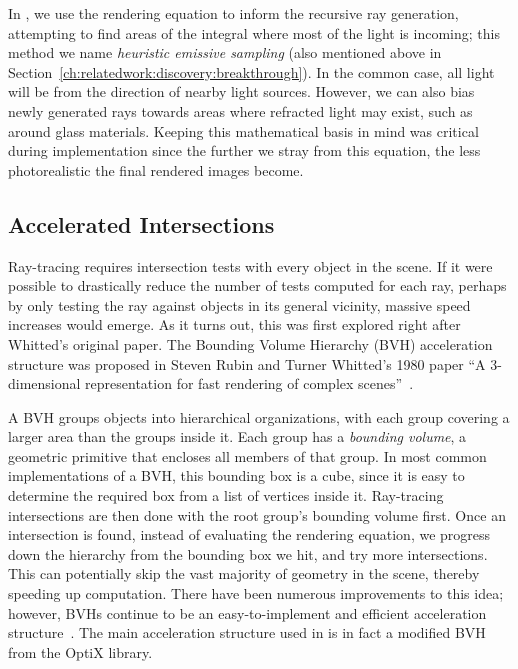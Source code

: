 In \name{}, we use the rendering equation to inform the recursive ray generation, attempting to find areas of the integral where most of the light is incoming; this method we name {\it heuristic emissive sampling\/} (also mentioned above in Section~\ref{ch:relatedwork:discovery:breakthrough}).
In the common case, all light will be from the direction of nearby light sources.
However, we can also bias newly generated rays towards areas where refracted light may exist, such as around glass materials.
Keeping this mathematical basis in mind was critical during implementation since the further we stray from this equation, the less photorealistic the final rendered images become.



\subsection{Accelerated Intersections}

Ray-tracing requires intersection tests with every object in the scene.
If it were possible to drastically reduce the number of tests computed for each ray, perhaps by only testing the ray against objects in its general vicinity, massive speed increases would emerge.
As it turns out, this was first explored right after Whitted's original paper.
The Bounding Volume Hierarchy (BVH) acceleration structure was proposed in Steven Rubin and Turner Whitted's 1980 paper ``A 3-dimensional representation for fast rendering of complex scenes''~\cite{rubin1980}.

A BVH groups objects into hierarchical organizations, with each group covering a larger area than the groups inside it.
Each group has a {\it bounding volume}, a geometric primitive that encloses all members of that group.
In most common implementations of a BVH, this bounding box is a cube, since it is easy to determine the required box from a list of vertices inside it.
Ray-tracing intersections are then done with the root group's bounding volume first.
Once an intersection is found, instead of evaluating the rendering equation, we progress down the hierarchy from the bounding box we hit, and try more intersections.
This can potentially skip the vast majority of geometry in the scene, thereby speeding up computation.
There have been numerous improvements to this idea; however, BVHs continue to be an easy-to-implement and efficient acceleration structure~\cite{prunier2017bvh}.
The main acceleration structure used in \name{} is in fact a modified BVH from the OptiX library.

